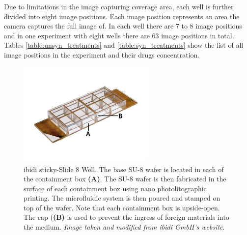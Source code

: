 \documentclass[pdftex,12pt,a4paper]{report}
\begin{document}
Due to limitations in the image capturing coverage area, each well is further divided into eight image positions. Each image position represents an area the camera captures the full image of. In each well there are 7 to 8 image positions and in one experiment with eight wells there are 63 image positions in total. Tables  \ref{table:unsyn_treatments} and \ref{table:syn_treatments} show the list of all image positions in the experiment and their drugs concentration.

\begin{figure}[H]
\centering
\includegraphics[width=0.6\textwidth]{images/sticky-slide-8-well-marked}
\caption[ibidi\textsuperscript{\textregistered} sticky-Slide 8 Well]{ibidi\textsuperscript{\textregistered} sticky-Slide 8 Well. The base SU-8 wafer is located in each of the containment box \textbf{(A)}. The SU-8 wafer is then fabricated in the surface of each containment box using nano photolitographic printing. The microfluidic system is then poured and stamped on top of the wafer. Note that each containment box is upside-open. The cap (\textbf{(B)} is used to prevent the ingress of foreign materials into the medium. \textit{Image taken and modified from ibidi GmbH's website}.}
\label{fig:ibidi}
\end{figure}
\end{document}
